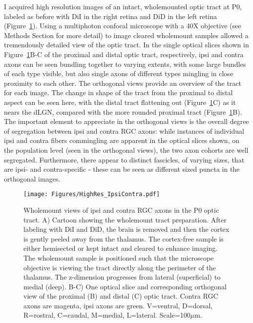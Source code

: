 I acquired high resolution images of an intact, wholemounted optic tract at P0, labeled as before with DiI in the right retina and DiD in the left retina (Figure~\ref{Figures/HighRes_IpsiContra}).
Using a multiphoton confocal microscope with a 40X objective (see Methods Section for more detail) to image cleared wholemount samples allowed a tremendously detailed view of the optic tract.
In the single optical slices shown in Figure~\ref{Figures/HighRes_IpsiContra}B-C of the proximal and distal optic tract, respectively, ipsi and contra axons can be seen bundling together to varying extents, with some large bundles of each type visible, but also single axons of different types mingling in close proximity to each other.
The orthogonal views provide an overview of the tract for each image.
The change in shape of the tract from the proximal to distal aspect can be seen here, with the distal tract flattening out (Figure~\ref{Figures/HighRes_IpsiContra}C) as it nears the dLGN, compared with the more rounded proximal tract (Figure~\ref{Figures/HighRes_IpsiContra}B).
The important element to appreciate in the orthogonal views is the overall degree of segregation between ipsi and contra RGC axons: while instances of individual ipsi and contra fibers commingling are apparent in the optical slices shown, on the population level (seen in the orthogonal views), the two axon cohorts are well segregated.
Furthermore, there appear to distinct fascicles, of varying sizes, that are ipsi- and contra-specific - these can be seen as different sized puncta in the orthogonal images.
\begin{figure}[hbtp]
    \begin{center}
        \texttt{[image: Figures/HighRes\_IpsiContra.pdf]}
        \caption[Wholemount views of ipsi and contra RGC axons in the P0 optic tract.]
        {Wholemount views of ipsi and contra RGC axons in the P0 optic tract.
		A) Cartoon showing the wholemount tract preparation.
		After labeling with DiI and DiD, the brain is removed and then the cortex is gently peeled away from the thalamus.
		The cortex-free sample is either hemisected or kept intact and cleared to enhance imaging.
		The wholemount sample is positioned such that the microscope objective is viewing the tract directly along the perimeter of the thalamus.
		The z-dimension progresses from lateral (superficial) to medial (deep).
		B-C) One optical slice and corresponding orthogonal view of the proximal (B) and distal (C) optic tract.
		Contra RGC axons are magenta, ipsi axons are green.
		V=ventral, D=dorsal, R=rostral, C=caudal, M=medial, L=lateral.
		Scale=100$\mu$m.
		}
        \label{Figures/HighRes_IpsiContra}
    \end{center}
\end{figure}


